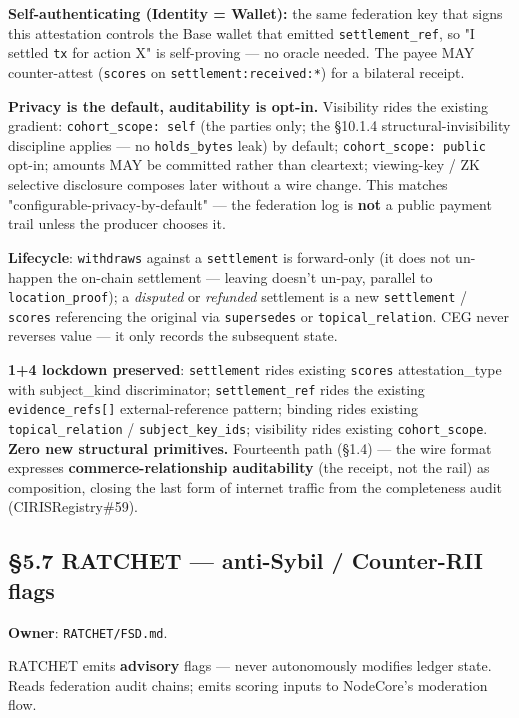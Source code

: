 \documentclass[10pt]{article}
\begin{document}
\textbf{Self-authenticating (Identity = Wallet):} the same federation key that signs this attestation controls the Base wallet that emitted \texttt{settlement\_ref}, so "I settled \texttt{tx} for action X" is self-proving — no oracle needed. The payee MAY counter-attest (\texttt{scores} on \texttt{settlement:received:*}) for a bilateral receipt.


\textbf{Privacy is the default, auditability is opt-in.} Visibility rides the existing gradient: \texttt{cohort\_scope: self} (the parties only; the §10.1.4 structural-invisibility discipline applies — no \texttt{holds\_bytes} leak) by default; \texttt{cohort\_scope: public} opt-in; amounts MAY be committed rather than cleartext; viewing-key / ZK selective disclosure composes later without a wire change. This matches "configurable-privacy-by-default" — the federation log is \textbf{not} a public payment trail unless the producer chooses it.


\textbf{Lifecycle}: \texttt{withdraws} against a \texttt{settlement} is forward-only (it does not un-happen the on-chain settlement — leaving doesn't un-pay, parallel to \texttt{location\_proof}); a \textit{disputed} or \textit{refunded} settlement is a new \texttt{settlement} / \texttt{scores} referencing the original via \texttt{supersedes} or \texttt{topical\_relation}. CEG never reverses value — it only records the subsequent state.


\textbf{1+4 lockdown preserved}: \texttt{settlement} rides existing \texttt{scores} attestation\_type with subject\_kind discriminator; \texttt{settlement\_ref} rides the existing \texttt{evidence\_refs[]} external-reference pattern; binding rides existing \texttt{topical\_relation} / \texttt{subject\_key\_ids}; visibility rides existing \texttt{cohort\_scope}. \textbf{Zero new structural primitives.} Fourteenth path (§1.4) — the wire format expresses \textbf{commerce-relationship auditability} (the receipt, not the rail) as composition, closing the last form of internet traffic from the completeness audit (CIRISRegistry\#59).


\subsection*{§5.7 RATCHET — anti-Sybil / Counter-RII flags}


\textbf{Owner}: \texttt{RATCHET/FSD.md}.


RATCHET emits \textbf{advisory} flags — never autonomously modifies ledger state. Reads federation audit chains; emits scoring inputs to NodeCore's moderation flow.
\end{document}
